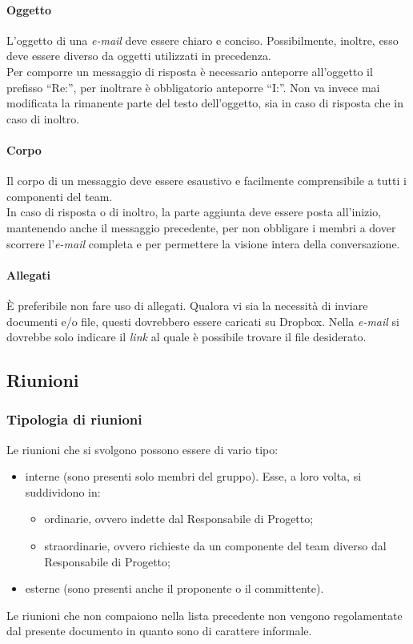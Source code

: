 			\paragraph{Oggetto}
				L’oggetto di una \textit{e-mail} deve essere chiaro e conciso. Possibilmente, inoltre, esso deve essere diverso da oggetti utilizzati in precedenza.\\
				Per comporre un messaggio di risposta è necessario anteporre all’oggetto il prefisso “Re:”, per inoltrare è obbligatorio anteporre “I:”. Non va invece mai modificata la rimanente parte del testo dell'oggetto, sia in caso di risposta che in caso di inoltro.
			\paragraph{Corpo}
				Il corpo di un messaggio deve essere esaustivo e facilmente comprensibile a tutti i componenti del team.\\
				In caso di risposta o di inoltro, la parte aggiunta deve essere posta all’inizio, mantenendo anche il messaggio precedente, per non obbligare i membri a dover scorrere l’\textit{e-mail} completa e per permettere la visione intera della conversazione.
			\paragraph{Allegati}
				È preferibile non fare uso di allegati. Qualora vi sia la necessità di inviare documenti e/o file, questi dovrebbero essere caricati su Dropbox. Nella \textit{e-mail} si dovrebbe solo indicare il \textit{link} al quale è possibile trovare il file desiderato.
	\subsection{Riunioni}
		\subsubsection{Tipologia di riunioni}
			Le riunioni che si svolgono possono essere di vario tipo:
			\begin{itemize}
				\item interne (sono presenti solo membri del gruppo). Esse, a loro volta, si suddividono in:
				\begin{itemize}
					\item ordinarie, ovvero indette dal Responsabile di Progetto;
					\item straordinarie, ovvero richieste da un componente del team diverso dal Responsabile di Progetto;
				\end{itemize}
				\item esterne (sono presenti anche il proponente o il committente).
			\end{itemize}
			Le riunioni che non compaiono nella lista precedente non vengono regolamentate dal presente documento in quanto sono di carattere informale.
